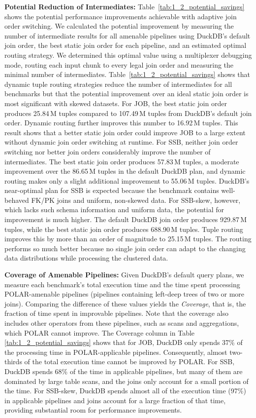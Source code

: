 \textbf{Potential Reduction of Intermediates:} Table~\ref{tab:1_2_potential_savings} shows the potential performance improvements achievable with adaptive join order switching. We calculated the potential improvement by measuring the number of intermediate results for all amenable pipelines using DuckDB's default join order, the best static join order for each pipeline, and an estimated optimal routing strategy. We determined this optimal value using a multiplexer debugging mode, routing each input chunk to every legal join order and measuring the minimal number of intermediates.
%
Table~\ref{tab:1_2_potential_savings} shows that dynamic tuple routing strategies reduce the number of intermediates for all benchmarks but that the potential improvement over an ideal static join order is most significant with skewed datasets. For JOB, the best static join order produces 25.84\,M tuples compared to 107.49\,M tuples from DuckDB's default join order. Dynamic routing further improves this number to 16.92\,M tuples. This result shows that a better static join order could improve JOB to a large extent without dynamic join order switching at runtime. For SSB, neither join order switching nor better join orders considerably improve the number of intermediates. The best static join order produces 57.83\,M tuples, a moderate improvement over the 86.65\,M tuples in the default DuckDB plan, and dynamic routing makes only a slight additional improvement to 55.06\,M tuples. DuckDB's near-optimal plan for SSB is expected because the benchmark contains well-behaved FK/PK joins and uniform, non-skewed data. For SSB-skew, however, which lacks such schema information and uniform data, the potential for improvement is much higher. The default DuckDB join order produces 929.87\,M tuples, while the best static join order produces 688.90\,M tuples. Tuple routing improves this by more than an order of magnitude to 25.15\,M tuples. The routing performs so much better because no single join order can adapt to the changing data distributions while processing the clustered data. 



\textbf{Coverage of Amenable Pipelines:} Given DuckDB's default query plans, we measure each benchmark's total execution time and the time spent processing POLAR-amenable pipelines (\ie pipelines containing left-deep trees of two or more joins). Comparing the difference of these values yields the \textit{Coverage}, that is, the fraction of time spent in improvable pipelines. Note that the coverage also includes other operators from these pipelines, such as scans and aggregations, which POLAR cannot improve. The Coverage column in Table \ref{tab:1_2_potential_savings} shows that for JOB, DuckDB only spends 37\% of the processing time in POLAR-applicable pipelines. Consequently, almost two-thirds of the total execution time cannot be improved by POLAR. For SSB, DuckDB spends 68\% of the time in applicable pipelines, but many of them are dominated by large table scans, and the joins only account for a small portion of the time. For SSB-skew, DuckDB spends almost all of the execution time (97\%) in applicable pipelines and joins account for a large fraction of that time, providing substantial room for performance improvements.

